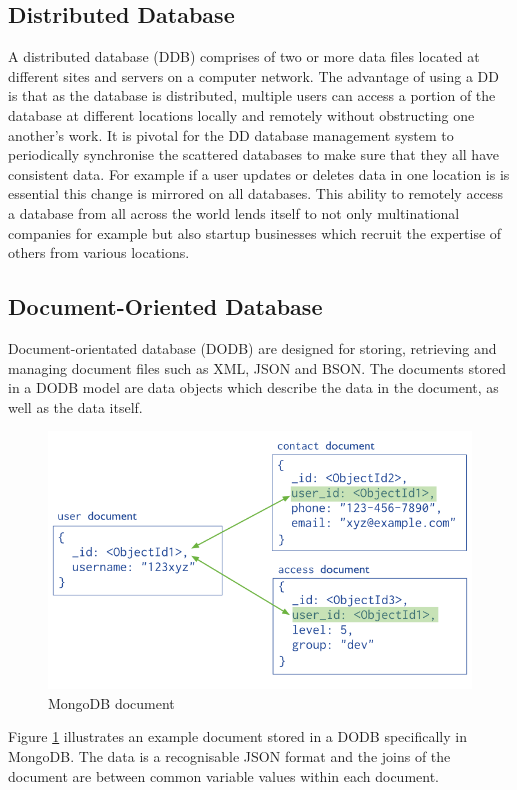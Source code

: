 \subsection{Distributed Database}\label{distributeddb}
A distributed database (DDB) comprises of two or more data files located at different sites and servers on a computer network. \cite{dd} The advantage of using a DD is that as the database is distributed, multiple users can access a portion of the database at different locations locally and remotely without obstructing one another's work. It is  pivotal for the DD database management system to periodically synchronise the scattered databases to make sure that they all have consistent data.  \cite{dd} For example if a user updates or deletes data in one location is is essential this change is mirrored on all databases. This ability to remotely access a database from all across the world lends itself to not only multinational companies for example but also startup businesses which recruit the expertise of others from various locations.

\subsection{Document-Oriented Database}
Document-orientated database (DODB) are designed for storing, retrieving and managing document files such as XML, JSON and BSON. The documents stored in a DODB model are data objects which describe the data in the document, as well as the data itself. \begin{figure}[h]\begin{center}\includegraphics[width=0.75\linewidth]{images/mongodbmodel}\caption{MongoDB document}\label{fig:mongo}\end{center}\end{figure} Figure \ref{fig:mongo} illustrates an example document stored in a DODB specifically in MongoDB. The data is a recognisable JSON format and the joins of the document are between common variable values within each document.

